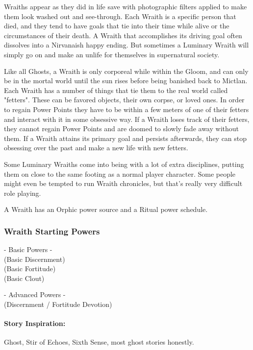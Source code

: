 Wraiths appear as they did in life save with photographic filters applied to make them look washed out and see-through. Each Wraith is a specific person that died, and they tend to have goals that tie into their time while alive or the circumstances of their death. A Wraith that accomplishes its driving goal often dissolves into a Nirvanaish happy ending. But sometimes a Luminary Wraith will simply go on and make an unlife for themselves in supernatural society.

Like all Ghosts, a Wraith is only corporeal while within the Gloom, and can only be in the mortal world until the sun rises before being banished back to Mictlan. Each Wraith has a number of things that tie them to the real world called "fetters". These can be favored objects, their own corpse, or loved ones. In order to regain Power Points they have to be within a few meters of one of their fetters and interact with it in some obsessive way. If a Wraith loses track of their fetters, they cannot regain Power Points and are doomed to slowly fade away without them. If a Wraith attains its primary goal and persists afterwards, they can stop obsessing over the past and make a new life with new fetters.

Some Luminary Wraiths come into being with a lot of extra disciplines, putting them on close to the same footing as a normal player character. Some people might even be tempted to run Wraith chronicles, but that's really very difficult role playing.

A Wraith has an Orphic power source and a Ritual power schedule.

\subsubsection{Wraith Starting Powers}

\hspace{\parindent} - Basic Powers -\\
 (Basic Discernment)\\
 (Basic Fortitude)\\
 (Basic Clout)

- Advanced Powers -\\
 (Discernment / Fortitude Devotion)

\paragraph{Story Inspiration:} Ghost, Stir of Echoes, Sixth Sense, most ghost stories honestly.

